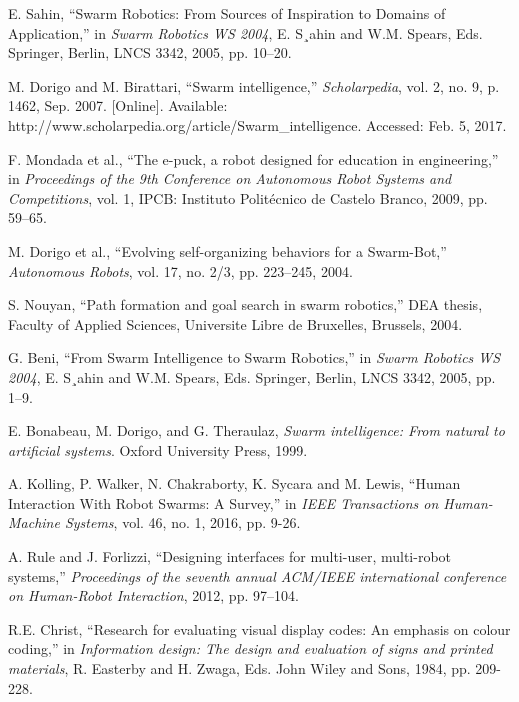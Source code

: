 \documentclass[hidelinks,10pt]{article}
\begin{document}
\begin{thebibliography}{1}
 E. Sahin, ``Swarm Robotics: From Sources of Inspiration to Domains of Application,'' in \textit{Swarm Robotics WS 2004}, E. S¸ahin and W.M. Spears, Eds. Springer, Berlin, LNCS 3342, 2005, pp. 10–20.

 M. Dorigo and M. Birattari, ``Swarm intelligence,'' \textit{Scholarpedia}, vol. 2, no. 9, p. 1462, Sep. 2007. [Online]. Available: http://www.scholarpedia.org/article/Swarm\_intelligence. Accessed: Feb. 5, 2017.

 F. Mondada et al., ``The e-puck, a robot designed for education in engineering,'' in \textit{Proceedings of the 9th Conference on Autonomous Robot Systems and Competitions}, vol. 1, IPCB: Instituto Politécnico de Castelo Branco, 2009, pp. 59–65.

 M. Dorigo et al., ``Evolving self-organizing behaviors for a Swarm-Bot,'' \textit{Autonomous Robots}, vol. 17, no. 2/3, pp. 223–245, 2004.

 S. Nouyan, ``Path formation and goal search in swarm robotics,'' DEA thesis, Faculty of Applied Sciences, Universite Libre de Bruxelles, Brussels, 2004.

G. Beni, ``From Swarm Intelligence to Swarm Robotics,'' in \textit{Swarm Robotics WS 2004}, E. S¸ahin and W.M. Spears, Eds. Springer, Berlin, LNCS 3342, 2005, pp. 1–9.

 E. Bonabeau, M. Dorigo, and G. Theraulaz, \textit{Swarm intelligence: From natural to artificial systems}. Oxford University Press, 1999.

 A. Kolling, P. Walker, N. Chakraborty, K. Sycara and M. Lewis, ``Human Interaction With Robot Swarms: A Survey,'' in \textit{IEEE Transactions on Human-Machine Systems}, vol. 46, no. 1, 2016, pp. 9-26.

 A. Rule and J. Forlizzi, ``Designing interfaces for multi-user, multi-robot systems,'' \textit{Proceedings of the seventh annual ACM/IEEE international conference on Human-Robot Interaction}, 2012, pp. 97–104.

 R.E. Christ, ``Research for evaluating visual display codes: An emphasis on colour coding,'' in \textit{Information design: The design and evaluation of signs and printed materials}, R. Easterby and H. Zwaga, Eds. John Wiley and Sons, 1984, pp. 209-228.


\end{thebibliography}
\end{document}
